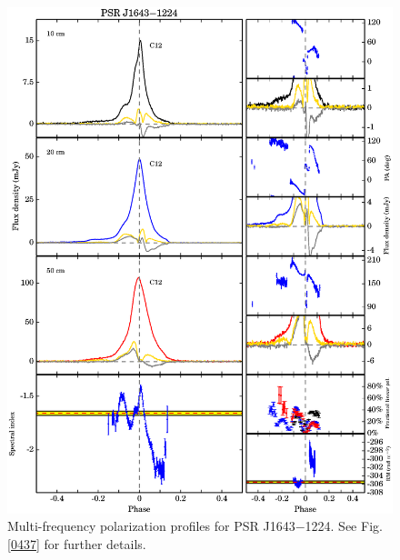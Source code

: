 \documentclass[useAMS,usenatbib]{mn2e}
\begin{document}
\begin{appendix}
\begin{figure}
\begin{center}
\includegraphics[width=6 in]{1643.ps}
\caption{Multi-frequency polarization profiles for PSR J1643$-$1224. 
See Fig. \ref{0437} for further details.}
\label{1643}
\end{center}
\end{figure}


\end{appendix}
\end{document}
